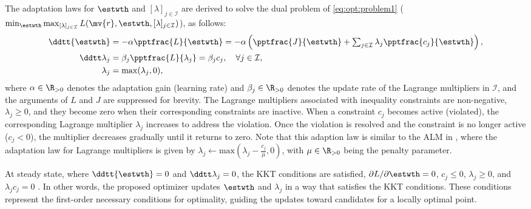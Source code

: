\documentclass[lettersize,journal]{IEEEtran}
\newcommand*{\fe}{\mv{r}}
\begin{document}
The adaptation laws for $\estwth$ and $[\lambda]_{j\in\mathcal I}$ are derived to solve the dual problem of \eqref{eq:opt:problem1} (\ie  $\min_{\estwth} \max_{[\lambda]_{j\in\mathcal I}}L(\fe,\estwth,[\lambda]_{j\in\mathcal I})$), as follows:
\begin{subequations}
    \begin{align}
            \ddtt{\estwth}
            &
            =
            -\alpha \pptfrac{L}{\estwth}
            =
            -\alpha 
            \left(
                \pptfrac{J}{\estwth}
                +
                \textstyle\sum_{j\in\mathcal{I}}
                \lambda_j 
                \pptfrac{c_j}{\estwth}
            \right),
        \label{eq:adap:th}
            \\
            \ddtt\lambda_j
            & 
            = 
            \beta_j\pptfrac{L}{\lambda_j} 
            = 
            \beta_j c_j ,
            \quad \forall j\in\mathcal I,
        \label{eq:adap:lbd}
            \\
            \lambda_j & = \max(\lambda_j,0) ,
        \label{eq:adap:lbd:max}
    \end{align}
    \label{eq:adaptation law}
\end{subequations}
where $\alpha\in\R_{>0}$ denotes the adaptation gain (learning rate) and $\beta_j\in\R_{>0}$ denotes the update rate of the Lagrange multipliers in $\mathcal I$, and the arguments of $L$ and $J$ are suppressed for brevity. 
The Lagrange multipliers associated with inequality constraints are non-negative, \ie $\lambda_j\ge 0$, and they become zero when their corresponding constraints are inactive. When a constraint $c_j$ becomes active (\ie violated), the corresponding Lagrange multiplier $\lambda_j$ increases to address the violation. Once the violation is resolved and the constraint is no longer active (\ie $c_j < 0$), the multiplier decreases gradually until it returns to zero. Note that this adaption law is similar to the ALM in \cite{Nocedal:2006aa}, where the adaptation law for Lagrange multipliers is given by $\lambda_j\leftarrow \text{max}(\lambda_j-\tfrac{c_j}{\mu},0)$, with $\mu\in\R_{>0}$ being the penalty parameter. 

At steady state, where $\ddtt{\estwth}=0$ and $\ddtt\lambda_j=0$, the KKT conditions are satisfied, \ie $\partial L/\partial \estwth=0$, $c_j \le 0$, $\lambda_j \ge 0$, and $\lambda_j c_j=0$ \cite[Chap.~12 T.~12.1]{Nocedal:2006aa}.
In other words, the proposed optimizer updates $\estwth$ and $\lambda_j$ in a way that satisfies the KKT conditions. 
These conditions represent the first-order necessary conditions for optimality, guiding the updates toward candidates for a locally optimal point.
\end{document}
